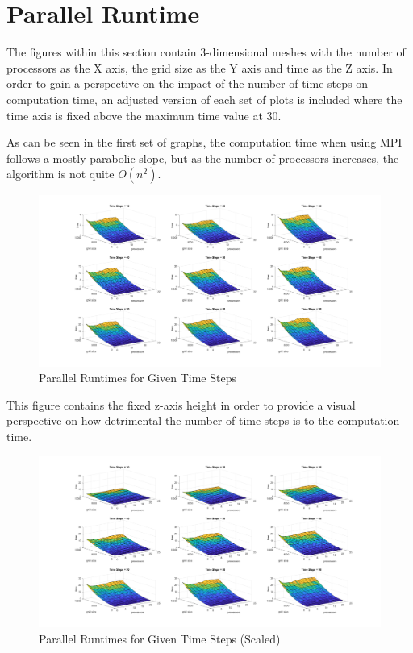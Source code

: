 \documentclass[a4paper, 11pt]{article}
\begin{document}
\section*{Parallel Runtime}
The figures within this section contain 3-dimensional meshes with the number of processors as the X axis, the grid size as the Y axis and time as the Z axis. In order to gain a perspective on the impact of the number of time steps on computation time, an adjusted version of each set of plots is included where the time axis is fixed above the maximum time value at 30.

As can be seen in the first set of graphs, the computation time when using MPI follows a mostly parabolic slope, but as the number of processors increases, the algorithm is not quite $O(n^2)$.
\begin{figure}[H]
	\centering
	\centerline{\includegraphics[width=7.5in]{parallel_time.png}}
	\caption{Parallel Runtimes for Given Time Steps}
\end{figure}

This figure contains the fixed z-axis height in order to provide a visual perspective on how detrimental the number of time steps is to the computation time.
\begin{figure}[H]
	\centering
	\centerline{\includegraphics[width=7.5in]{parallel_time_scaled.png}}
	\caption{Parallel Runtimes for Given Time Steps (Scaled)}
\end{figure}
\end{document}
